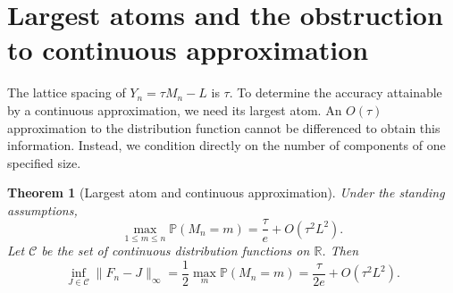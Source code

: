 \documentclass[11pt,letterpaper]{article}
\numberwithin{equation}{section}
\newtheorem{theorem}{Theorem}[section]
\theoremstyle{remark}\newtheorem{remark}[theorem]{Remark}
\theoremstyle{definition}\newtheorem{definition}[theorem]{Definition}\theoremstyle{plain}
\newcommand{\Pbb}{\mathbb P}
\newcommand{\R}{\mathbb R}
\begin{document}
\section{Largest atoms and the obstruction to continuous approximation}
\label{ncy:gb:sec:atoms}

The lattice spacing of $Y_n=\tau M_n-L$ is $\tau$.  To determine the
accuracy attainable by a continuous approximation, we need its largest
atom.  An $O(\tau)$ approximation to the distribution function cannot be
differenced to obtain this information.  Instead, we condition directly
on the number of components of one specified size.

\begin{theorem}[Largest atom and continuous approximation]
\label{ncy:gb:thm:atom}
Under the standing assumptions,
\begin{equation}
\label{ncy:gb:eq:largest-atom}
 \max_{1\le m\le n}\Pbb(M_n=m)
   =\frac{\tau}{e}+O(\tau^2L^2).
\end{equation}
Let $\mathcal C$ be the set of continuous distribution functions on
$\R$.  Then
\begin{equation}
\label{ncy:gb:eq:continuous-minimax}
 \inf_{J\in\mathcal C}\|F_n-J\|_\infty
 =\frac12\max_m\Pbb(M_n=m)
 =\frac{\tau}{2e}+O(\tau^2L^2).
\end{equation}
\end{theorem}
\end{document}
